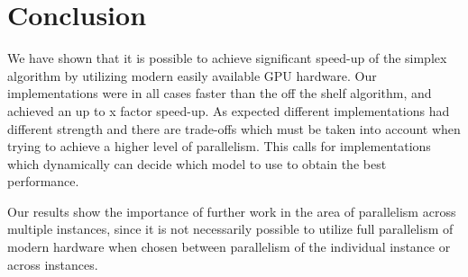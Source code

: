 \section{Conclusion}
We have shown that it is possible to achieve significant speed-up of the simplex algorithm by utilizing modern easily available GPU hardware. Our implementations were in all cases faster than the off the shelf algorithm, and achieved an up to x factor speed-up. As expected different implementations had different strength and there are trade-offs which must be taken into account when trying to achieve a higher level of parallelism. This calls for implementations which dynamically can decide which model to use to obtain the best performance.

Our results show the importance of further work in the area of parallelism across multiple instances, since it is not necessarily possible to utilize full parallelism of modern hardware when chosen between parallelism of the individual instance or across instances.